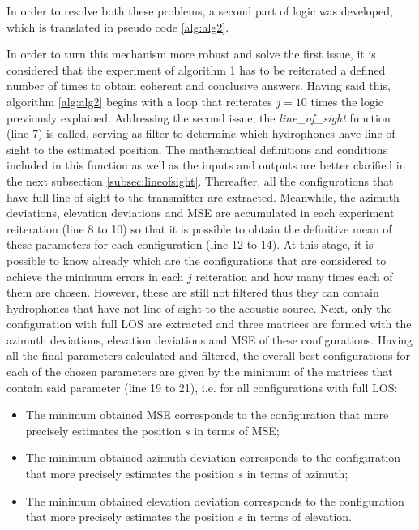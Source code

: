 In order to resolve both these problems, a second part of logic was developed, which is translated in pseudo code \ref{alg:alg2}.

In order to turn this mechanism more robust and solve the first issue, it is considered that the experiment of algorithm 1 has to be reiterated a defined number of times to obtain coherent and conclusive answers. Having said this, algorithm \ref{alg:alg2} begins with a loop that reiterates $j = 10$ times the logic previously explained. Addressing the second issue, the \textit{line\_of\_sight} function (line 7) is called, serving as filter to determine which hydrophones have line of sight to the estimated position. The mathematical definitions and conditions included in this function as well as the inputs and outputs are better clarified in the next subsection \ref{subsec:lineofsight}. Thereafter, all the configurations that have full line of sight to the transmitter are extracted. Meanwhile, the azimuth deviations, elevation deviations and MSE are accumulated in each experiment reiteration (line 8 to 10) so that it is possible to obtain the definitive mean of these parameters for each configuration (line 12 to 14). At this stage, it is possible to know already which are the configurations that are considered to achieve the minimum errors in each $j$ reiteration and how many times each of them are chosen. However, these are still not filtered thus they can contain hydrophones that have not line of sight to the acoustic source. Next, only the configuration with full LOS are extracted and three matrices are formed with the azimuth deviations, elevation deviations and MSE of these configurations. Having all the final parameters calculated and filtered, the overall best configurations for each of the chosen parameters are given by the minimum of the matrices that contain said parameter (line 19 to 21), i.e. for all configurations with full LOS:

\begin{itemize}
	
	\item  The minimum obtained MSE corresponds to the configuration that more precisely estimates the position $s$ in terms of MSE;
	
	\item The minimum obtained azimuth deviation corresponds to the configuration that more precisely estimates the position $s$ in terms of azimuth;
	
	\item The minimum obtained elevation deviation corresponds to the configuration that more precisely estimates the position $s$ in terms of elevation.
	
\end{itemize}

